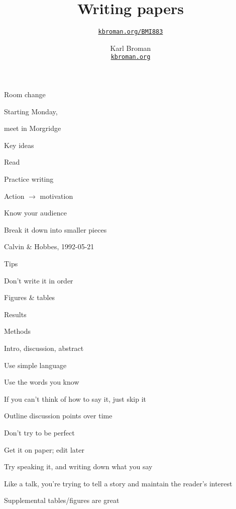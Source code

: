 \documentclass[aspectratio=169,12pt,t]{beamer}
\title{Writing papers}
\subtitle{}
\author{\href{https://kbroman.org/BMI883}{\tt kbroman.org/BMI883} }
\institute{}
\date{\small \hspace{3in} Karl Broman \\
  \hspace{3in} \href{https://kbroman.org}{\color{foreground}
    \small \tt kbroman.org}}
\begin{document}
{
\frame{
  \titlepage
} }



\begin{frame}[c]{Room change}

  \LARGE

  \centerline{Starting Monday,}

  \bigskip

  \centerline{meet in { Morgridge}}

\end{frame}




\begin{frame}{Key ideas}


  \bbi
\item Read
\item Practice writing
\item Action $\longrightarrow$ motivation
\item Know your audience
\item Break it down into smaller pieces
  \ei

\end{frame}


\begin{frame}{}

\vspace*{20mm}


\vfill

\hfill {\footnotesize Calvin \& Hobbes, 1992-05-21}

\end{frame}



\begin{frame}{Tips}

      \bi
    \item Don't write it in order
      \bi
    \item Figures \& tables
    \item Results
    \item Methods
    \item Intro, discussion, abstract
      \ei
    \item Use simple language
      \bi
    \item Use the words you know
    \item If you can't think of how to say it, just skip it
      \ei
    \item Outline discussion points over time
    \item Don't try to be perfect
      \bi
    \item Get it on paper; edit later
      \ei
    \item Try speaking it, and writing down what you say
      \bi
      \item Like a talk, you're trying to tell a story and maintain
        the reader's interest
      \ei
    \item Supplemental tables/figures are great
    \ei


\end{frame}
\end{document}
